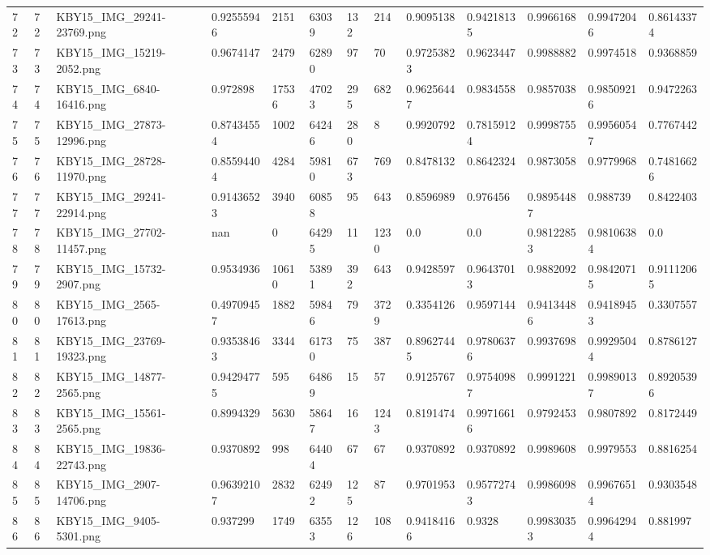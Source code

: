 \documentclass[11pt, a4paper, twoside]{report}
\begin{document}
\begin{longtable}[c]{@{}lllllllllllll@{}}
72 & 72 & KBY15\_IMG\_29241-23769.png & 0.92555946 & 2151 & 63039 & 132 & 214 & 0.9095138 & 0.94218135 & 0.9966168 & 0.99472046 & 0.86143374 \\
73 & 73 & KBY15\_IMG\_15219-2052.png & 0.9674147 & 2479 & 62890 & 97 & 70 & 0.97253823 & 0.9623447 & 0.9988882 & 0.9974518 & 0.9368859 \\
74 & 74 & KBY15\_IMG\_6840-16416.png & 0.972898 & 17536 & 47023 & 295 & 682 & 0.96256447 & 0.9834558 & 0.9857038 & 0.98509216 & 0.9472263 \\
75 & 75 & KBY15\_IMG\_27873-12996.png & 0.87434554 & 1002 & 64246 & 280 & 8 & 0.9920792 & 0.78159124 & 0.9998755 & 0.99560547 & 0.7767442 \\
76 & 76 & KBY15\_IMG\_28728-11970.png & 0.85594404 & 4284 & 59810 & 673 & 769 & 0.8478132 & 0.8642324 & 0.9873058 & 0.9779968 & 0.74816626 \\
77 & 77 & KBY15\_IMG\_29241-22914.png & 0.91436523 & 3940 & 60858 & 95 & 643 & 0.8596989 & 0.976456 & 0.98954487 & 0.988739 & 0.8422403 \\
78 & 78 & KBY15\_IMG\_27702-11457.png & nan & 0 & 64295 & 11 & 1230 & 0.0 & 0.0 & 0.98122853 & 0.98106384 & 0.0 \\
79 & 79 & KBY15\_IMG\_15732-2907.png & 0.9534936 & 10610 & 53891 & 392 & 643 & 0.9428597 & 0.96437013 & 0.9882092 & 0.98420715 & 0.91112065 \\
80 & 80 & KBY15\_IMG\_2565-17613.png & 0.49709457 & 1882 & 59846 & 79 & 3729 & 0.3354126 & 0.9597144 & 0.94134486 & 0.94189453 & 0.3307557 \\
81 & 81 & KBY15\_IMG\_23769-19323.png & 0.93538463 & 3344 & 61730 & 75 & 387 & 0.89627445 & 0.97806376 & 0.9937698 & 0.99295044 & 0.8786127 \\
82 & 82 & KBY15\_IMG\_14877-2565.png & 0.94294775 & 595 & 64869 & 15 & 57 & 0.9125767 & 0.97540987 & 0.9991221 & 0.99890137 & 0.89205396 \\
83 & 83 & KBY15\_IMG\_15561-2565.png & 0.8994329 & 5630 & 58647 & 16 & 1243 & 0.8191474 & 0.99716616 & 0.9792453 & 0.9807892 & 0.8172449 \\
84 & 84 & KBY15\_IMG\_19836-22743.png & 0.9370892 & 998 & 64404 & 67 & 67 & 0.9370892 & 0.9370892 & 0.9989608 & 0.9979553 & 0.8816254 \\
85 & 85 & KBY15\_IMG\_2907-14706.png & 0.96392107 & 2832 & 62492 & 125 & 87 & 0.9701953 & 0.95772743 & 0.9986098 & 0.99676514 & 0.9303548 \\
86 & 86 & KBY15\_IMG\_9405-5301.png & 0.937299 & 1749 & 63553 & 126 & 108 & 0.94184166 & 0.9328 & 0.99830353 & 0.99642944 & 0.881997 \\

\end{longtable}
\end{document}
